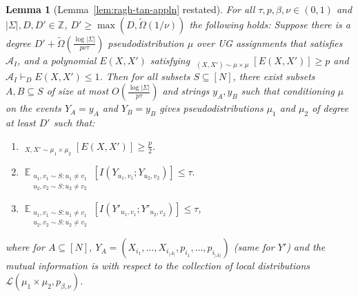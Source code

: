 \documentclass[11pt]{article}
\DeclareMathOperator*{\E}{\mathbb{E}}
\DeclareMathOperator*{\pE}{\widetilde{\mathbb{E}}}
\def \Z {\mathbb{Z}}
\def \cA {\mathcal{A}}
\def \cL {\mathcal{L}}
\newtheorem{lemma}[theorem]{Lemma}
\theoremstyle{definition}
\begin{document}
\begin{lemma}[Lemma~\ref{lem:ragh-tan-appln} restated]
For all $\tau,p,\beta,\nu \in (0,1)$ and $|\Sigma|, D, D' \in \Z$, $D' \geq \max(D,\widetilde{\Omega}(1/\nu))$ the following holds: Suppose there is a degree $D' + \widetilde{\Omega}(\frac{\log |\Sigma|}{p \nu \tau})$ pseudodistribution $\mu$ over UG assignments that satisfies $\cA_I$, and a polynomial $E(X,X')$ satisfying $\pE_{(X,X') \sim \mu \times \mu}[E(X,X')] \geq p$ and $\cA_I \vdash_D E(X,X') \leq 1$. Then for all subsets $S \subseteq [N]$, there exist subsets $A, B \subseteq S$ of size at most $O(\frac{\log|\Sigma|}{p\tau})$ and strings $y_A, y_B$ such that conditioning $\mu$ on the events $Y_A = y_A$ and $Y_B = y_B$ gives pseudodistributions $\mu_1$ and $\mu_2$ of degree at least $D'$ such that: 
\begin{enumerate}
\item $\pE_{X,X'\sim \mu_1\times\mu_2}[E(X,X')] \geq \frac{p}{2}$.
\item $\E_{\substack{u_1,v_1 \sim S: u_1 \neq v_1\\ u_2,v_2 \sim S: u_2 \neq v_2}}[I(Y_{u_1,v_1};Y_{u_2,v_2})] \leq \tau.$
\item $\E_{\substack{u_1,v_1 \sim S: u_1 \neq v_1\\ u_2,v_2 \sim S: u_2 \neq v_2}}[I(Y'_{u_1,v_1};Y'_{u_2,v_2})] \leq \tau$,
\end{enumerate}
where for $A \subseteq [N]$, $Y_{A} = (X_{i_1},\ldots, X_{i_{|A|}},p_{i_1},\ldots, p_{i_{|A|}})$ (same for $Y'$) and the mutual information is with respect to the collection of local distributions $\cL(\mu_1 \times \mu_2,p_{\beta,\nu})$.
\end{lemma}
\end{document}
